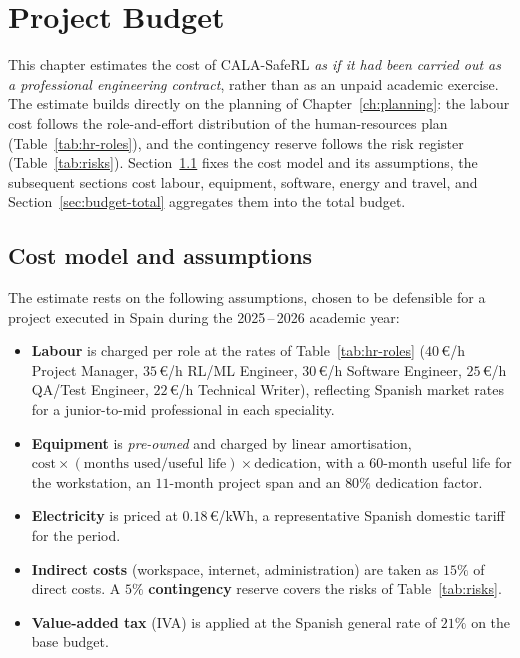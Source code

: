 
\chapter{Project Budget}\label{ch:budget}

This chapter estimates the cost of CALA-SafeRL \emph{as if it had been carried out as a
professional engineering contract}, rather than as an unpaid academic exercise. The estimate
builds directly on the planning of Chapter~\ref{ch:planning}: the labour cost follows the
role-and-effort distribution of the human-resources plan (Table~\ref{tab:hr-roles}), and the
contingency reserve follows the risk register (Table~\ref{tab:risks}).
Section~\ref{sec:budget-assumptions} fixes the cost model and its assumptions, the subsequent
sections cost labour, equipment, software, energy and travel, and
Section~\ref{sec:budget-total} aggregates them into the total budget.

\section{Cost model and assumptions}\label{sec:budget-assumptions}

The estimate rests on the following assumptions, chosen to be defensible for a project executed
in Spain during the 2025\,--\,2026 academic year:

\begin{itemize}
  \item \textbf{Labour} is charged per role at the rates of Table~\ref{tab:hr-roles}
        (\(40\)\,€/h Project Manager, \(35\)\,€/h RL/ML Engineer, \(30\)\,€/h Software Engineer,
        \(25\)\,€/h QA/Test Engineer, \(22\)\,€/h Technical Writer), reflecting Spanish market
        rates for a junior-to-mid professional in each speciality.
  \item \textbf{Equipment} is \emph{pre-owned} and charged by linear amortisation,
        \(\text{cost}\times(\text{months used}/\text{useful life})\times\text{dedication}\),
        with a \(60\)-month useful life for the workstation, an \(11\)-month project span and an
        \(80\%\) dedication factor.
  \item \textbf{Electricity} is priced at \(0.18\)\,€/kWh, a representative Spanish domestic
        tariff for the period.
  \item \textbf{Indirect costs} (workspace, internet, administration) are taken as \(15\%\) of
        direct costs. A \(5\%\) \textbf{contingency} reserve covers the risks of
        Table~\ref{tab:risks}.
  \item \textbf{Value-added tax} (IVA) is applied at the Spanish general rate of \(21\%\) on the
        base budget.
\end{itemize}

